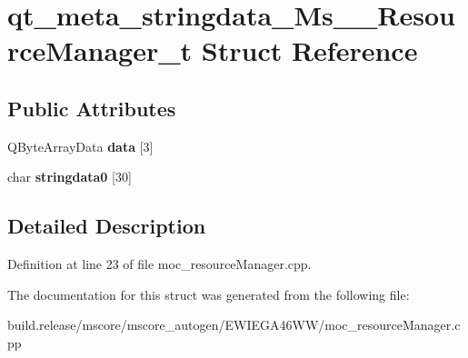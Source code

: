 \hypertarget{structqt__meta__stringdata___ms_____resource_manager__t}{}\section{qt\+\_\+meta\+\_\+stringdata\+\_\+\+Ms\+\_\+\+\_\+\+Resource\+Manager\+\_\+t Struct Reference}
\label{structqt__meta__stringdata___ms_____resource_manager__t}
\subsection*{Public Attributes}
\begin{DoxyCompactItemize}
\item 
\mbox{\label{structqt__meta__stringdata___ms_____resource_manager__t_abff07f24df4cae3e2228e378a7aea354}} 
Q\+Byte\+Array\+Data {\bfseries data} \mbox{[}3\mbox{]}
\item 
\mbox{\label{structqt__meta__stringdata___ms_____resource_manager__t_aa77408a1c7b6836fa4eb196b99fd2b02}} 
char {\bfseries stringdata0} \mbox{[}30\mbox{]}
\end{DoxyCompactItemize}


\subsection{Detailed Description}


Definition at line 23 of file moc\+\_\+resource\+Manager.\+cpp.



The documentation for this struct was generated from the following file\+:\begin{DoxyCompactItemize}
\item 
build.\+release/mscore/mscore\+\_\+autogen/\+E\+W\+I\+E\+G\+A46\+W\+W/moc\+\_\+resource\+Manager.\+cpp\end{DoxyCompactItemize}
